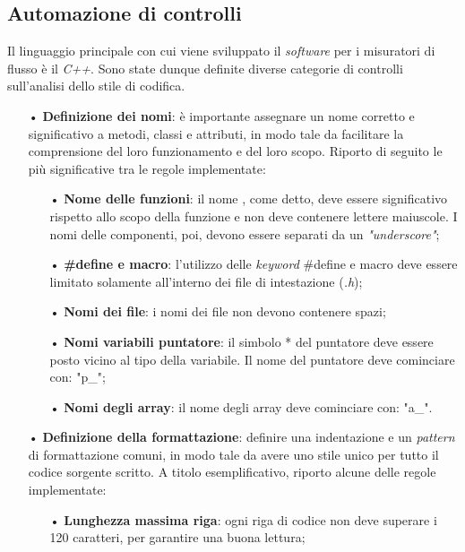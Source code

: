 \subsection{Automazione di controlli}
Il linguaggio principale con cui viene sviluppato il \textit{software} per i misuratori di flusso è il \textit{C++}. Sono state dunque definite diverse categorie di controlli sull'analisi dello stile di codifica.

\begin{itemize}
\item[•] \textbf{Definizione dei nomi}: è importante assegnare un nome corretto e significativo a metodi, classi e attributi, in modo tale da facilitare la comprensione del loro funzionamento e del loro scopo. Riporto di seguito le più significative tra le regole implementate:
\begin{itemize}
\item[•] \textbf{Nome delle funzioni}: il nome , come detto, deve essere significativo rispetto allo scopo della funzione e non deve contenere lettere maiuscole. I nomi delle componenti, poi, devono essere separati da un \textit{"underscore"};

\item[•] \textbf{\#define e macro}: l'utilizzo delle \textit{keyword} \#define e macro deve essere limitato solamente all'interno dei file di intestazione (\textit{.h});

\item[•] \textbf{Nomi dei file}: i nomi dei file non devono contenere spazi;

\item[•] \textbf{Nomi variabili puntatore}: il simbolo * del puntatore deve essere posto vicino al tipo della variabile. Il nome del puntatore deve cominciare con: "p\_";

\item[•] \textbf{Nomi degli array}: il nome degli array deve cominciare con: "a\_".
\end{itemize}

\item[•] \textbf{Definizione della formattazione}: definire una indentazione e un \textit{pattern} di formattazione comuni, in modo tale da avere uno stile unico per tutto il codice sorgente scritto. A titolo esemplificativo, riporto alcune delle regole implementate:
\begin{itemize}
\item[•] \textbf{Lunghezza massima riga}: ogni riga di codice non deve superare i 120 caratteri, per garantire una buona lettura;


\end{itemize}
\end{itemize}
